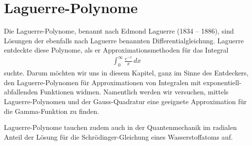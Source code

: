 %
%
%
\chapter{Laguerre-Polynome\label{chapter:laguerre}}
\begin{refsection}

{\parindent0pt Die} Laguerre\--Polynome, 
benannt nach Edmond Laguerre (1834 -- 1886),
sind Lösungen der ebenfalls nach Laguerre benannten Differentialgleichung.
Laguerre entdeckte diese Polynome, als er Approximations\-methoden 
für das Integral 
\begin{align*}
\int_0^\infty \frac{e^{-x}}{x} \, dx
\end{align*}
suchte.
Darum möchten wir uns in diesem Kapitel, 
ganz im Sinne des Entdeckers,
den Laguerre-Polynomen für Approximationen von Integralen mit 
exponentiell-abfallenden Funktionen widmen.
Namentlich werden wir versuchen, mittels Laguerre-Polynomen und
der Gauss-Quadratur eine geeignete Approximation für die Gamma-Funktion zu finden.

Laguerre-Polynome tauchen zudem auch in der Quantenmechanik im radialen Anteil 
der Lösung für die Schrödinger-Gleichung eines Wasserstoffatoms auf.





% 
% 

\printbibliography[heading=subbibliography]
\end{refsection}
